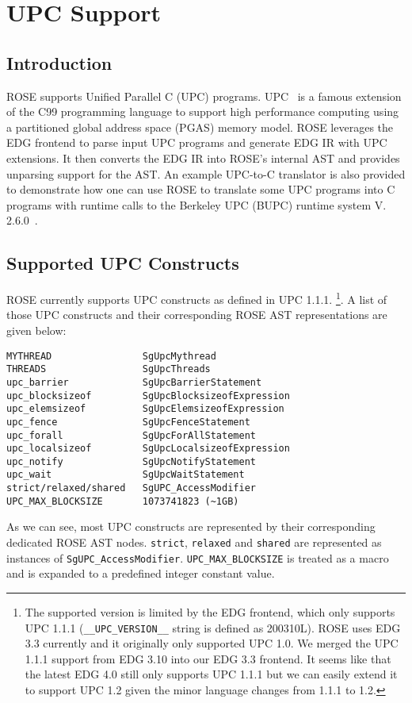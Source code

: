 \chapter{UPC Support}
\label{chap::upcsupport}

\section{Introduction}
ROSE supports Unified Parallel C (UPC) programs.
UPC~\cite{UPC:Web} is a famous extension of the C99 programming language to support high performance computing using a partitioned global address space (PGAS) memory model.
ROSE leverages the EDG frontend to parse input UPC programs and generate EDG IR with UPC extensions.
It then converts the EDG IR into ROSE's internal AST and provides unparsing support for the AST.
An example UPC-to-C translator is also provided to demonstrate how one can use ROSE to 
translate some UPC programs into C programs with runtime calls to the Berkeley UPC (BUPC) runtime system V. 2.6.0~\cite{BUPC:Web}.

\section{Supported UPC Constructs}
ROSE currently supports UPC constructs as defined in UPC 1.1.1.
\footnote{
The supported version is limited by the EDG
frontend, which only supports UPC 1.1.1 (\lstinline{__UPC_VERSION__} string
is defined as 200310L).
ROSE uses EDG 3.3 currently and it originally only supported UPC 1.0. 
We merged the UPC 1.1.1 support from EDG 3.10 into our EDG 3.3 frontend. 
It seems like that the latest EDG 4.0 still only supports UPC 1.1.1 but we
can easily extend it to support UPC 1.2 given the minor language changes
from 1.1.1 to 1.2.}.
A list of those UPC constructs and their corresponding ROSE AST representations are given below:
\begin{verbatim}
MYTHREAD                SgUpcMythread
THREADS                 SgUpcThreads
upc_barrier             SgUpcBarrierStatement
upc_blocksizeof         SgUpcBlocksizeofExpression
upc_elemsizeof          SgUpcElemsizeofExpression
upc_fence               SgUpcFenceStatement
upc_forall              SgUpcForAllStatement
upc_localsizeof         SgUpcLocalsizeofExpression
upc_notify              SgUpcNotifyStatement
upc_wait                SgUpcWaitStatement
strict/relaxed/shared   SgUPC_AccessModifier
UPC_MAX_BLOCKSIZE       1073741823 (~1GB)
\end{verbatim}
As we can see, most UPC constructs are represented by their corresponding dedicated ROSE AST nodes. 
\lstinline{strict}, \lstinline{relaxed} and \lstinline{shared} are
represented as instances of \lstinline{SgUPC_AccessModifier}.
\lstinline{UPC_MAX_BLOCKSIZE} is treated as a macro and is expanded to a predefined integer constant value.

